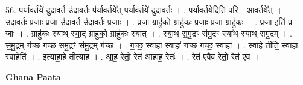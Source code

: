 \documentclass[17pt]{extarticle}
\begin{document}
56. प॒र्या॒व॒र्तये॑ दुदाव॒र्त उ॑दाव॒र्तः प॑र्याव॒र्तये᳚त् पर्याव॒र्तये॑ दुदाव॒र्तः । . प॒र्या॒व॒र्तये॒दिति॑ परि - आ॒व॒र्तये᳚त् । . उ॒दा॒व॒र्तः प्र॒जाः प्र॒जा उ॑दाव॒र्त उ॑दाव॒र्तः प्र॒जाः । . प्र॒जा ग्राहु॑को॒ ग्राहु॑कः प्र॒जाः प्र॒जा ग्राहु॑कः । . प्र॒जा इति॑ प्र - जाः । . ग्राहु॑कः स्याथ् स्या॒द् ग्राहु॑को॒ ग्राहु॑कः स्यात् । . स्या॒थ् स॒मु॒द्रꣳ स॑मु॒द्रꣳ स्या᳚थ् स्याथ् समु॒द्रम् । . स॒मु॒द्रम् ग॑च्छ गच्छ समु॒द्रꣳ स॑मु॒द्रम् ग॑च्छ । . ग॒च्छ॒ स्वाहा॒ स्वाहा॑ गच्छ गच्छ॒ स्वाहा᳚ । . स्वाहे तीति॒ स्वाहा॒ स्वाहेति॑ । . इत्या॑हा॒हे तीत्या॑ह । . आ॒ह॒ रेतो॒ रेत॑ आहाह॒ रेतः॑ । . रेत॑ ए॒वैव रेतो॒ रेत॑ ए॒व । \newline

\textbf{Ghana Paata } \newline
\end{document}
